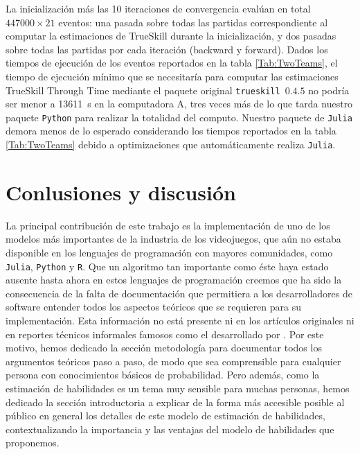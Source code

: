 \documentclass[a4paper,11pt]{book}
\theoremstyle{definition}
\newif\ifen
\newcommand{\en}[1]{\ifen#1\fi}
\begin{document}
%
La inicialización más las 10 iteraciones de convergencia evalúan en total $447000\times 21$ eventos: una pasada sobre todas las partidas correspondiente al computar la estimaciones de TrueSkill durante la inicialización, y dos pasadas sobre todas las partidas por cada iteración (backward y forward).
%
Dados los tiempos de ejecución de los eventos reportados en la tabla \ref{Tab:TwoTeams}, el tiempo de ejecución mínimo que se necesitaría para computar las estimaciones TrueSkill Through Time mediante el paquete original \texttt{trueskill}~$0.4.5$ no podría ser menor a \SI{13611}{\s} en la computadora A, tres veces más de lo que tarda nuestro paquete \texttt{Python} para realizar la totalidad del computo.
%
Nuestro paquete de \texttt{Julia} demora menos de lo esperado considerando los tiempos reportados en la tabla \ref{Tab:TwoTeams} debido a optimizaciones que automáticamente realiza \texttt{Julia}.
%




\section{Conlusiones y discusión} \label{sec:summary}


La principal contribuci\'on de este trabajo es la implementaci\'on de uno de los modelos más importantes de la industria de los videojuegos, que a\'un no estaba disponible en los lenguajes de programaci\'on con mayores comunidades, como \texttt{Julia}, \texttt{Python} y \texttt{R}.
%
Que un algoritmo tan importante como éste haya estado ausente hasta ahora en estos lenguajes de programaci\'on creemos que ha sido la consecuencia de la falta de documentaci\'on que permitiera a los desarrolladores de software entender todos los aspectos te\'oricos que se requieren para su implementaci\'on.
%
Esta informaci\'on no está presente ni en los artículos originales \cite{Herbrich2007, Dangauthier2007} ni en reportes técnicos informales famosos como el desarrollado por \cite{Mosser2011}.
%
Por este motivo, hemos dedicado la secci\'on metodología para documentar todos los argumentos te\'oricos paso a paso, de modo que sea comprensible para cualquier persona con conocimientos básicos de probabilidad.
%
Pero además, como la estimación de habilidades es un tema muy sensible para muchas personas, hemos dedicado la sección introductoria a explicar de la forma más accesible posible al público en general los detalles de este modelo de estimación de habilidades, contextualizando la importancia y las ventajas del modelo de habilidades que proponemos.
\end{document}
